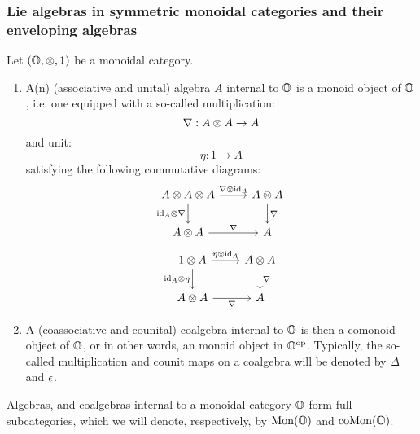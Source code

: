             \subsubsection{Lie algebras in symmetric monoidal categories and their enveloping algebras}
                \begin{definition} \label{def: algebras_and_coalgebras}
                    Let $(\O, \tensor, 1)$ be a monoidal category. 
                        \begin{enumerate}
                            \item A(n) (associative and unital) algebra $A$ internal to $\mathbb{O}$ is a monoid object of $\mathbb{O}$, i.e. one equipped with a so-called multiplication:
                                $$\nabla: A \tensor A \to A$$
                            and unit:
                                $$\eta: 1 \to A$$
                            satisfying the following commutative diagrams:
                                $$
                                    \begin{tikzcd}
                                    	{A \tensor A \tensor A} & {A \tensor A} \\
                                    	{A \tensor A} & {A}
                                    	\arrow["{\id_A \tensor \nabla}"', from=1-1, to=2-1]
                                    	\arrow["{\nabla}", from=2-1, to=2-2]
                                    	\arrow["{\nabla \tensor \id_A}", from=1-1, to=1-2]
                                    	\arrow["{\nabla}", from=1-2, to=2-2]
                                    \end{tikzcd}
                                $$
                                $$
                                    \begin{tikzcd}
                                    	{1 \tensor A} & {A \tensor A} \\
                                    	{A \tensor A} & {A}
                                    	\arrow["{\nabla}", from=1-2, to=2-2]
                                    	\arrow["{\nabla}"', from=2-1, to=2-2]
                                    	\arrow["{\id_A \tensor \eta}"', from=1-1, to=2-1]
                                    	\arrow["{\eta \tensor \id_A}", from=1-1, to=1-2]
                                    \end{tikzcd}
                                $$
                            \item A (coassociative and counital) coalgebra internal to $\mathbb{O}$ is then a comonoid object of $\mathbb{O}$, or in other words, an monoid object in $\mathbb{O}^{\mathrm{op}}$. Typically, the so-called multiplication and counit maps on a coalgebra will be denoted by $\Delta$ and $\epsilon$.
                        \end{enumerate}
                    Algebras, and coalgebras internal to a monoidal category $\mathbb{O}$ form full subcategories, which we will denote, respectively, by $\mathrm{Mon}(\mathbb{O})$ and $\mathrm{co}\mathrm{Mon}(\mathbb{O})$.
                \end{definition}
